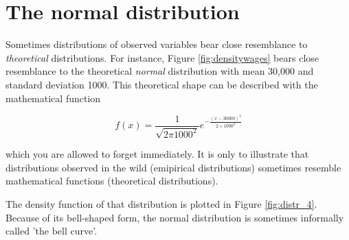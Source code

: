 \documentclass[]{book}\usepackage[]{graphicx}\usepackage[]{color}
\begin{document}
% 




\section{The normal distribution}

Sometimes distributions of observed variables bear close resemblance to \textit{theoretical} distributions. For instance, Figure \ref{fig:densitywages} bears close resemblance to the theoretical \textit{normal} distribution with mean 30,000 and standard deviation 1000. This theoretical shape can be described with the mathematical function

\begin{equation}
f(x)  = \frac{1}{\sqrt{2 \pi 1000^2}} e^{ { -\frac{(x - 30000)^2}{2 \times  1000^2}  } }
\end{equation}

which you are allowed to forget immediately. It is only to illustrate that distributions observed in the wild (emipirical distributions) sometimes resemble  mathematical functions (theoretical distributions).

The density function of that distribution is plotted in Figure \ref{fig:distr_4}. Because of its bell-shaped form, the normal distribution is sometimes informally called 'the bell curve'.
\end{document}

